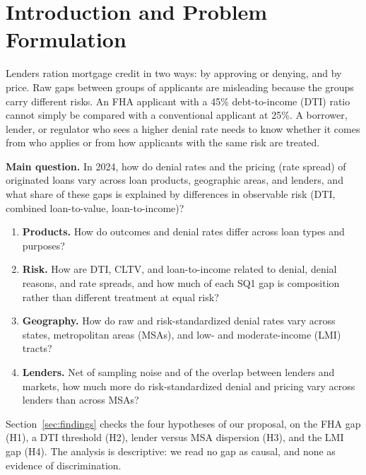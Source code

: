 \documentclass[acmtog,nonacm]{acmart}
\begin{document}

\maketitle

\section{Introduction and Problem Formulation}

Lenders ration mortgage credit in two ways: by approving or denying, and by price. Raw gaps between groups of applicants are misleading because the groups carry different risks. An FHA applicant with a 45\% debt-to-income (DTI) ratio cannot simply be compared with a conventional applicant at 25\%. A borrower, lender, or regulator who sees a higher denial rate needs to know whether it comes from who applies or from how applicants with the same risk are treated.

\textbf{Main question.} In 2024, how do denial rates and the pricing (rate spread) of originated loans vary across loan products, geographic areas, and lenders, and what share of these gaps is explained by differences in observable risk (DTI, combined loan-to-value, loan-to-income)?

\begin{enumerate}[label=\textbf{SQ\arabic*.}, leftmargin=2.6em]
\item \textbf{Products.} How do outcomes and denial rates differ across loan types and purposes?
\item \textbf{Risk.} How are DTI, CLTV, and loan-to-income related to denial, denial reasons, and rate spreads, and how much of each SQ1 gap is composition rather than different treatment at equal risk?
\item \textbf{Geography.} How do raw and risk-standardized denial rates vary across states, metropolitan areas (MSAs), and low- and moderate-income (LMI) tracts?
\item \textbf{Lenders.} Net of sampling noise and of the overlap between lenders and markets, how much more do risk-standardized denial and pricing vary across lenders than across MSAs?
\end{enumerate}

Section~\ref{sec:findings} checks the four hypotheses of our proposal, on the FHA gap (H1), a DTI threshold (H2), lender versus MSA dispersion (H3), and the LMI gap (H4). The analysis is descriptive: we read no gap as causal, and none as evidence of discrimination.
\end{document}
